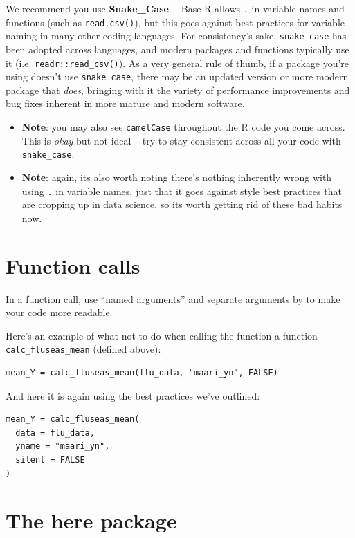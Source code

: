 \documentclass[]{book}
\begin{document}
We recommend you use \textbf{Snake\_Case}. - Base R allows \texttt{.} in variable names and functions (such as \texttt{read.csv()}), but this goes against best practices for variable naming in many other coding languages. For consistency's sake, \texttt{snake\_case} has been adopted across languages, and modern packages and functions typically use it (i.e. \texttt{readr::read\_csv()}). As a very general rule of thumb, if a package you're using doesn't use \texttt{snake\_case}, there may be an updated version or more modern package that \emph{does}, bringing with it the variety of performance improvements and bug fixes inherent in more mature and modern software.

\begin{itemize}
\item
  \textbf{Note}: you may also see \texttt{camelCase} throughout the R code you come across. This is \emph{okay} but not ideal -- try to stay consistent across all your code with \texttt{snake\_case}.
\item
  \textbf{Note}: again, its also worth noting there's nothing inherently wrong with using \texttt{.} in variable names, just that it goes against style best practices that are cropping up in data science, so its worth getting rid of these bad habits now.
\end{itemize}

\hypertarget{function-calls}{%
\section{Function calls}\label{function-calls}}

In a function call, use ``named arguments'' and separate arguments by to make your code more readable.

Here's an example of what not to do when calling the function a function \texttt{calc\_fluseas\_mean} (defined above):

\begin{verbatim}
mean_Y = calc_fluseas_mean(flu_data, "maari_yn", FALSE)
\end{verbatim}

And here it is again using the best practices we've outlined:

\begin{verbatim}
mean_Y = calc_fluseas_mean(
  data = flu_data, 
  yname = "maari_yn",
  silent = FALSE
)
\end{verbatim}

\hypertarget{the-here-package}{%
\section{The here package}\label{the-here-package}}
\end{document}

